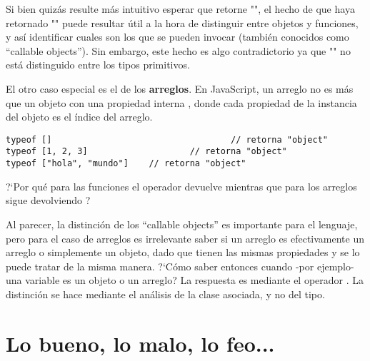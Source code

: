 Si bien quizás resulte más intuitivo esperar que retorne "", el hecho de que haya retornado "" puede resultar útil a la hora de distinguir entre objetos y funciones, y así identificar cuales son los que se pueden invocar (también conocidos como "`callable objects"'). Sin embargo, este hecho es algo contradictorio ya que "" no está distinguido entre los tipos primitivos.

El otro caso especial es el de los \textbf{arreglos}. En JavaScript, un arreglo no es más que un objeto con una propiedad interna , donde cada propiedad de la instancia del objeto es el índice del arreglo.

\begin{lstlisting}[title={Analizando \code{typeof} de arreglos}]
typeof []									// retorna "object"
typeof [1, 2, 3]					// retorna "object"
typeof ["hola", "mundo"]	// retorna "object"
\end{lstlisting}

?`Por qué para las funciones el operador  devuelve  mientras que para los arreglos sigue devolviendo ? 

Al parecer, la distinción de los "`callable objects"' es importante para el lenguaje, pero para el caso de arreglos es irrelevante saber si un arreglo es efectivamente un arreglo o simplemente un objeto, dado que tienen las mismas propiedades y se lo puede tratar de la misma manera. ?`Cómo saber entonces cuando -por ejemplo- una variable es un objeto o un arreglo? La respuesta es mediante el operador . La distinción se hace mediante el análisis de la clase asociada, y no del tipo.



\section{Lo bueno, lo malo, lo feo...}
